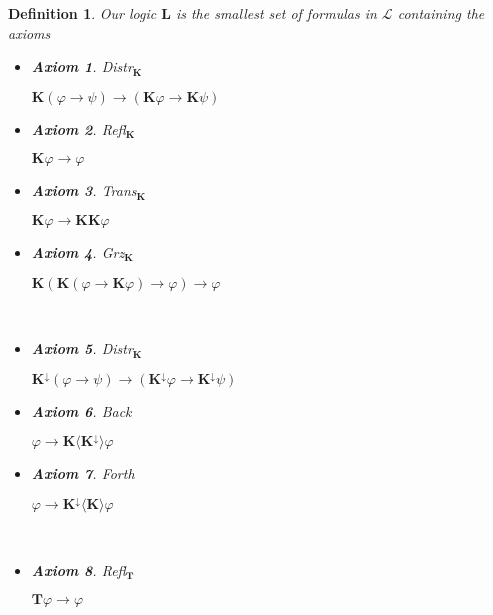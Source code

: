 \documentclass{article}
\newcommand{\tmmathbf}[1]{\ensuremath{\boldsymbol{#1}}}
\newtheorem{axiom}{Axiom}
\newtheorem{definition}{Definition}
\newcommand{\Lang}{\mathcal{L}}
\newcommand{\Logic}{\ensuremath{\tmmathbf{\text{L}}}}
\newcommand{\Know}{\tmmathbf{\text{K}}}
\newcommand{\Knownby}{\tmmathbf{\text{K}^{\downarrow}}}
\newcommand{\diaKnow}{\langle \tmmathbf{\text{K}} \rangle}
\newcommand{\diaKnownby}{\langle \tmmathbf{\text{K}^{\downarrow}} \rangle}
\newcommand{\Typ}{\ensuremath{\tmmathbf{\text{T}}}}
\begin{document}
\begin{definition}
  Our logic {\Logic} is the smallest set of formulas in $\Lang$ containing the
  axioms
  \begin{itemize}
    \item \begin{axiom}
      Distr$_{\Know}$
    \end{axiom}\quad$\Know (\varphi \rightarrow \psi) \rightarrow \left( \Know
    \varphi \rightarrow \Know \psi \right)$
    
    \item \begin{axiom}
      Refl$_{\Know}$
    \end{axiom}\quad$\Know \varphi \rightarrow \varphi$
    
    \item \begin{axiom}
      Trans$_{\Know}$
    \end{axiom}\quad$\Know \varphi \rightarrow \Know \Know \varphi$
    
    \item \begin{axiom}
      Grz$_{\Know}$
    \end{axiom}\quad$\Know \left( \Know \left( \varphi \rightarrow \Know
    \varphi \right) \rightarrow \varphi \right) \rightarrow \varphi$
    
    \
    
    \item \begin{axiom}
      Distr$_{\Know}$
    \end{axiom}\quad$\Knownby (\varphi \rightarrow \psi) \rightarrow \left(
    \Knownby \varphi \rightarrow \Knownby \psi \right)$
    
    \item \begin{axiom}
      Back
    \end{axiom}\quad$\varphi \rightarrow \Know \diaKnownby \varphi$
    
    \item \begin{axiom}
      Forth
    \end{axiom}\quad$\varphi \rightarrow \Knownby \diaKnow \varphi$
    
    \
    
    \item \begin{axiom}
      Refl$_{\Typ}$
    \end{axiom}\quad$\Typ \varphi \rightarrow \varphi$
    

\end{itemize}
\end{definition}
\end{document}
